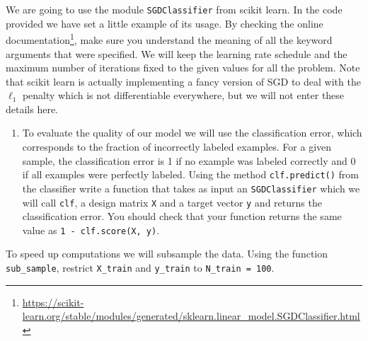 \documentclass{article}
\begin{document}
We are going to use the module \texttt{SGDClassifier} from scikit learn. In the code provided we have set a little example of its usage. By checking the online documentation\footnote{\url{https://scikit-learn.org/stable/modules/generated/sklearn.linear_model.SGDClassifier.html}}, make sure you understand the meaning of all the keyword arguments that were specified. We will keep the learning rate schedule and the maximum number of iterations fixed to the given values for all the problem. Note that scikit learn is actually implementing a fancy version of SGD to deal with the $\ell_1$ penalty which is not differentiable everywhere, but we will not enter these details here.

\begin{enumerate}
\setcounter{enumi}{\value{saveenum}}
  \item To evaluate the quality of our model we will use the classification error, which corresponds to the fraction of incorrectly labeled examples. For a given sample, the classification error is 1 if no example was labeled correctly and 0 if all examples were perfectly labeled. 
  Using the method \texttt{clf.predict()} from the classifier write a function that takes as input an \texttt{SGDClassifier} which we will call \texttt{clf}, a design matrix \texttt{X} and a target vector \texttt{y} and returns the classification error. You should check that your function returns the same value as \newline \texttt{1 - clf.score(X, y)}.
\setcounter{saveenum}{\value{enumi}}
\end{enumerate}


To speed up computations we will subsample the data. Using the function \texttt{sub\_sample}, restrict \texttt{X\_train} and \texttt{y\_train} to \texttt{N\_train = 100}. 
\end{document}
